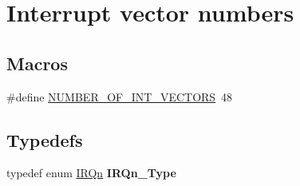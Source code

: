\hypertarget{group___interrupt__vector__numbers}{}\section{Interrupt vector numbers}
\label{group___interrupt__vector__numbers}
\subsection*{Macros}
\begin{DoxyCompactItemize}
\item 
\#define \mbox{\hyperlink{group___interrupt__vector__numbers_gafe46d81f4fa2c4f6ed1361f24f046fa8}{N\+U\+M\+B\+E\+R\+\_\+\+O\+F\+\_\+\+I\+N\+T\+\_\+\+V\+E\+C\+T\+O\+RS}}~48
\end{DoxyCompactItemize}
\subsection*{Typedefs}
\begin{DoxyCompactItemize}
\item 
\mbox{\label{group___interrupt__vector__numbers_gac3af4a32370fb28c4ade8bf2add80251}} 
typedef enum \mbox{\hyperlink{group___interrupt__vector__numbers_ga666eb0caeb12ec0e281415592ae89083}{I\+R\+Qn}} {\bfseries I\+R\+Qn\+\_\+\+Type}
\end{DoxyCompactItemize}
